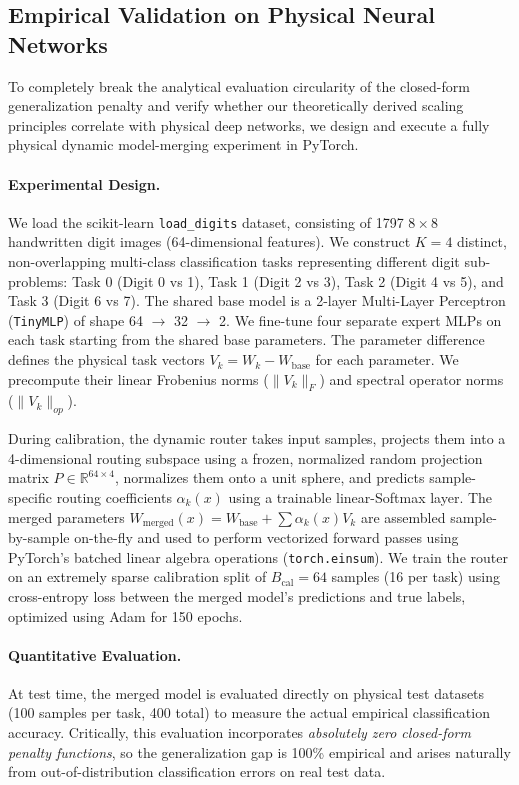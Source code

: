 \subsection{Empirical Validation on Physical Neural Networks}
To completely break the analytical evaluation circularity of the closed-form generalization penalty and verify whether our theoretically derived scaling principles correlate with physical deep networks, we design and execute a fully physical dynamic model-merging experiment in PyTorch.

\paragraph{Experimental Design.} We load the scikit-learn \texttt{load\_digits} dataset, consisting of 1797 $8\times 8$ handwritten digit images (64-dimensional features). We construct $K=4$ distinct, non-overlapping multi-class classification tasks representing different digit sub-problems: Task 0 (Digit 0 vs 1), Task 1 (Digit 2 vs 3), Task 2 (Digit 4 vs 5), and Task 3 (Digit 6 vs 7). The shared base model is a 2-layer Multi-Layer Perceptron (\texttt{TinyMLP}) of shape 64 $\to$ 32 $\to$ 2. We fine-tune four separate expert MLPs on each task starting from the shared base parameters. The parameter difference defines the physical task vectors $V_k = W_k - W_{\text{base}}$ for each parameter. We precompute their linear Frobenius norms ($\|V_k\|_F$) and spectral operator norms ($\|V_k\|_{op}$).

During calibration, the dynamic router takes input samples, projects them into a 4-dimensional routing subspace using a frozen, normalized random projection matrix $P \in \mathbb{R}^{64 \times 4}$, normalizes them onto a unit sphere, and predicts sample-specific routing coefficients $\alpha_k(x)$ using a trainable linear-Softmax layer. The merged parameters $W_{\text{merged}}(x) = W_{\text{base}} + \sum \alpha_k(x) V_k$ are assembled sample-by-sample on-the-fly and used to perform vectorized forward passes using PyTorch's batched linear algebra operations (\texttt{torch.einsum}). We train the router on an extremely sparse calibration split of $B_{\text{cal}}=64$ samples (16 per task) using cross-entropy loss between the merged model's predictions and true labels, optimized using Adam for 150 epochs.

\paragraph{Quantitative Evaluation.} At test time, the merged model is evaluated directly on physical test datasets (100 samples per task, 400 total) to measure the actual empirical classification accuracy. Critically, this evaluation incorporates \emph{absolutely zero closed-form penalty functions}, so the generalization gap is 100\% empirical and arises naturally from out-of-distribution classification errors on real test data.

